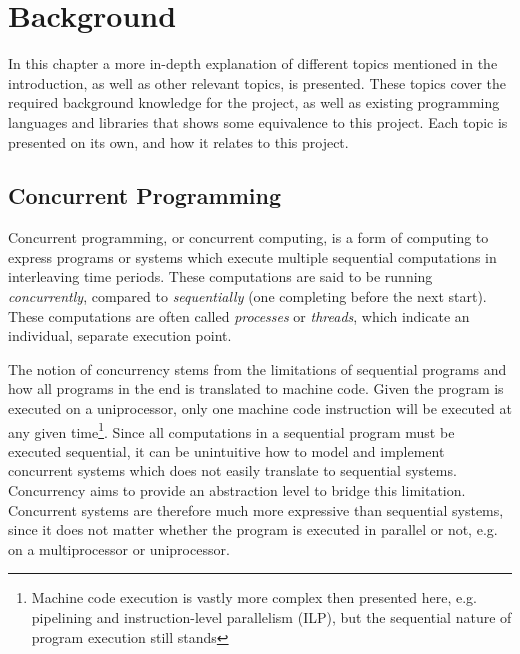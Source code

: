 

\chapter{Background}
\label{ch:background}


In this chapter a more in-depth explanation of different topics mentioned in the introduction, as well as other relevant topics, is presented. These topics cover the required background knowledge for the project, as well as existing programming languages and libraries that shows some equivalence to this project. Each topic is presented on its own, and how it relates to this project. 


\section{Concurrent Programming}
\label{sec:concurrent_programming}


Concurrent programming, or concurrent computing, is a form of computing to express programs or systems which execute multiple sequential computations in interleaving time periods. These computations are said to be running \textit{concurrently}, compared to \textit{sequentially} (one completing before the next start). These computations are often called \textit{processes} or \textit{threads}, which indicate an individual, separate execution point. 

The notion of concurrency stems from the limitations of sequential programs and how all programs in the end is translated to machine code. Given the program is executed on a uniprocessor, only one machine code instruction will be executed at any given time\footnote{Machine code execution is vastly more complex then presented here, e.g. pipelining and instruction-level parallelism (ILP), but the sequential nature of program execution still stands}.  Since all computations in a sequential program must be executed sequential, it can be unintuitive how to model and implement concurrent systems which does not easily translate to sequential systems. Concurrency aims to provide an abstraction level to bridge this limitation. Concurrent systems are therefore much more expressive than sequential systems, since it does not matter whether the program is executed in parallel or not, e.g. on a multiprocessor or uniprocessor.

